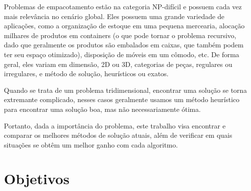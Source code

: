 Problemas de empacotamento estão na categoria NP-difícil e possuem cada vez mais relevância no cenário global.
Eles possuem uma grande variedade de aplicações, como a organização de estoque em uma pequena mercearia, alocação milhares de produtos em containers (o que pode tornar o problema recursivo, dado que geralmente os produtos são embalados em caixas, que também podem ter seu espaço otimizado), disposição de móveis em um cômodo, etc.
De forma geral, eles variam em dimensão, 2D ou 3D, categorias de peças, regulares ou irregulares, e método de solução, heurísticos ou exatos.

Quando se trata de um problema tridimensional, encontrar uma solução se torna extremante complicado, nesses casos geralmente usamos um método heurístico para encontrar uma solução boa, mas não necessariamente ótima.

Portanto, dada a importância do problema, este trabalho visa encontrar e comparar os melhores métodos de solução atuais, além de verificar em quais situações se obtêm um melhor ganho com cada algoritmo.

%
%
%

\section{Objetivos}\label{sec:Objetivos}
